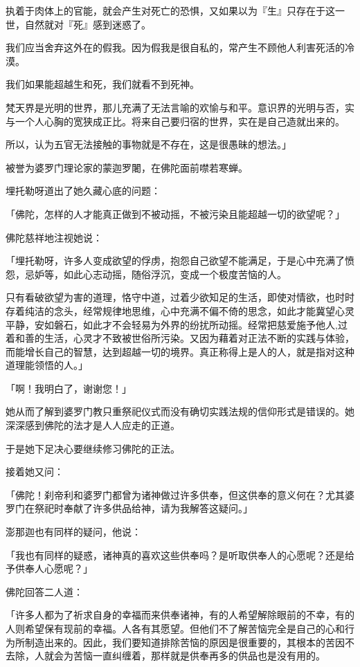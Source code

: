 \documentclass[twoside,openany]{book}
\begin{document}
执着于肉体上的官能，就会产生对死亡的恐惧，又如果以为『生』只存在于这一世，自然就对『死』感到迷惑了。

我们应当舍弃这外在的假我。因为假我是很自私的，常产生不顾他人利害死活的冷漠。

我们如果能超越生和死，我们就看不到死神。

梵天界是光明的世界，那儿充满了无法言喻的欢愉与和平。意识界的光明与否，实与一个人心胸的宽狭成正比。将来自己要归宿的世界，实在是自己造就出来的。

所以，认为五官无法接触的事物就是不存在，这是很愚昧的想法。」

被誉为婆罗门理论家的蒙迦罗闍，在佛陀面前噤若寒蝉。

埋托勒呀道出了她久藏心底的问题：

「佛陀，怎样的人才能真正做到不被动摇，不被污染且能超越一切的欲望呢？」

佛陀慈祥地注视她说：

「埋托勒呀，许多人变成欲望的俘虏，抱怨自己欲望不能满足，于是心中充满了愤怨，忌妒等，如此心志动摇，随俗浮沉，变成一个极度苦恼的人。

只有看破欲望为害的道理，恪守中道，过着少欲知足的生活，即使对情欲，也时时存着纯洁的念头，经常规律地思维，心中充满不偏不倚的思念，如此才能冀望心灵平静，安如磐石，如此才不会轻易为外界的纷扰所动摇。经常把慈爱施予他人,过着和善的生活，心灵才不致被世俗所污染。又因为藉着对正法不断的实践与体验，而能增长自己的智慧，达到超越一切的境界。真正称得上是人的人，就是指对这种道理能领悟的人。」

「啊！我明白了，谢谢您！」

她从而了解到婆罗门教只重祭祀仪式而没有确切实践法规的信仰形式是错误的。她深深感到佛陀的法才是人人应走的正道。

于是她下足决心要继续修习佛陀的正法。

接着她又问：

「佛陀！刹帝利和婆罗门都曾为诸神做过许多供奉，但这供奉的意义何在？尤其婆罗门在祭祀时奉献了许多供品给神，请为我解答这疑问。」

澎那迦也有同样的疑问，他说：

「我也有同样的疑惑，诸神真的喜欢这些供奉吗？是听取供奉人的心愿呢？还是给予供奉人心愿呢？」

佛陀回答二人道：

「许多人都为了祈求自身的幸福而来供奉诸神，有的人希望解除眼前的不幸，有的人则希望保有现前的幸福。人各有其愿望。但他们不了解苦恼完全是自己的心和行为所制造出来的。因此，我们要知道排除苦恼的原因是很重要的，其根本的苦因不去除，人就会为苦恼一直纠缠着，那样就是供奉再多的供品也是没有用的。
\end{document}
